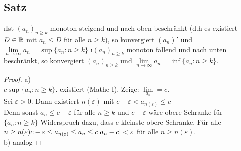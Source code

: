 \subsection[Satz: Monotonie und Konvergenz]{Satz}\label{sec:2.16}
\begin{enumerate}[a)]
\i Ist $(a_n)_{n \geq k}$ monoton steigend und nach oben beschränkt (d.h es existiert $D \in \mathbb{R}$ mit $a_n \leq D$ für alle $n \geq k$), so konvergiert $(a_n)'$ und $\lim\limits_{n \rightarrow \infty}a_n = \sup\{a_n: n\geq k \}$
\i $(a_n)_{n \geq k}$ monoton fallend und nach unten beschränkt, so konvergiert $(a_n)_{n \geq k}$ und $\lim\limits_{n \rightarrow \infty} a_n = \inf \{a_n: n\geq k \}.$
\begin{proof}
a)\\
$ c \sup \{a_n : n \geq k\}.$ existiert (Mathe I).
Zeige: $\lim\limits_{a_n} = c$.\\
Sei $\varepsilon > 0$. Dann existiert $n(\varepsilon)$ mit $c-\varepsilon < a_{n(\varepsilon)} \leq c$\\
Denn sonst $a_n \leq c - \varepsilon$ für alle $n \geq k$ und $c - \varepsilon$ wäre obere Schranke für $\{a_n : n \geq k \}$ Widerspruch dazu, dass c kleinste obere Schranke. Für alle $n \geq n(\varepsilon)\\
c- \varepsilon \leq a_{n(\varepsilon)} \leq a_n \leq c\\
\lvert a_n -c \rvert < \varepsilon$ für alle $n \geq n(\varepsilon).$\\
b) analog
\end{proof}
\end{enumerate}
